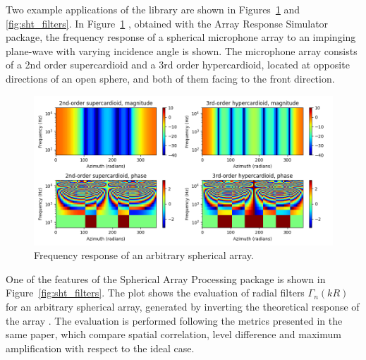 Two example applications of the library are shown in Figures~\ref{fig:array_response} and \ref{fig:sht_filters}.
In Figure~\ref{fig:array_response} , obtained with the Array Response Simulator package, the frequency response of a spherical microphone array to an impinging plane-wave with varying incidence angle is shown. The microphone array consists of a 2nd order supercardioid and a 3rd order hypercardioid, located at opposite directions of an open sphere, and both of them facing to the front direction. \\

\begin{figure}[h!]
  \centering
    \includegraphics[width=\textwidth]{Figures/DataGeneration/array_response.png}
    \caption{Frequency response of an arbitrary spherical array.}
    \label{fig:array_response}
\end{figure}


One of the features of the Spherical Array Processing package is shown in Figure~\ref{fig:sht_filters}. The plot shows the evaluation of radial filters $\Gamma_n(kR)$ for an arbitrary spherical array, generated by inverting the theoretical response of the array \cite{Bertet2006}. 
The evaluation is performed following the metrics presented in the same paper, which compare spatial correlation, level difference and maximum amplification with respect to the ideal case. \\

